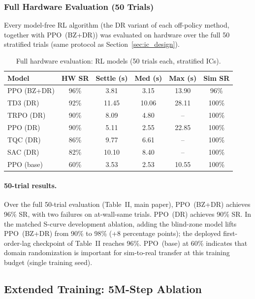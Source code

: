 \subsubsection{Full Hardware Evaluation (50 Trials)}
\label{appendix:multi_algo_hw}

Every model-free RL algorithm (the DR variant of each off-policy method,
together with PPO~(BZ+DR)) was evaluated on hardware over the full 50
stratified trials (same protocol as Section~\ref{sec:ic_design}).

\begin{table}[!t]
\centering
\renewcommand{\arraystretch}{1.15}
\caption{Full hardware evaluation: RL models (50 trials each,
         stratified ICs).}
\label{tab:rl_hw_50trial}
\begin{tabular}{lccccc}
\toprule
\textbf{Model} & \textbf{HW SR} & \textbf{Settle (s)}
  & \textbf{Med (s)} & \textbf{Max (s)} & \textbf{Sim SR} \\
\midrule
PPO (BZ+DR) & 96\% & 3.81 & 3.15 & 13.90 & 96\% \\
TD3 (DR)    & 92\% & 11.45 & 10.06 & 28.11 & 100\% \\
TRPO (DR)   & 90\% & 8.09 & 4.80 & --  & 100\% \\
PPO (DR)    & 90\% & 5.11 & 2.55 & 22.85 & 100\% \\
TQC (DR)    & 86\% & 9.77 & 6.61 & --  & 100\% \\
SAC (DR)    & 82\% & 10.10 & 8.40 & --  & 100\% \\
PPO (base)  & 60\% & 3.53 & 2.53 & 10.55 & 100\%  \\
\bottomrule
\end{tabular}
\end{table}

\paragraph{50-trial results.}
Over the full 50-trial evaluation (Table~II, main paper),
PPO~(BZ+DR) achieves 96\% SR, with two failures on at-wall-same trials.
PPO~(DR) achieves 90\% SR. In the matched S-curve development ablation,
adding the blind-zone model lifts PPO~(BZ+DR) from 90\% to 98\%
(+8 percentage points); the deployed first-order-lag checkpoint of
Table~II reaches 96\%.
PPO~(base) at 60\% indicates that domain randomization is important
for sim-to-real transfer at this training budget (single training seed).

\subsection{Extended Training: 5M-Step Ablation}

